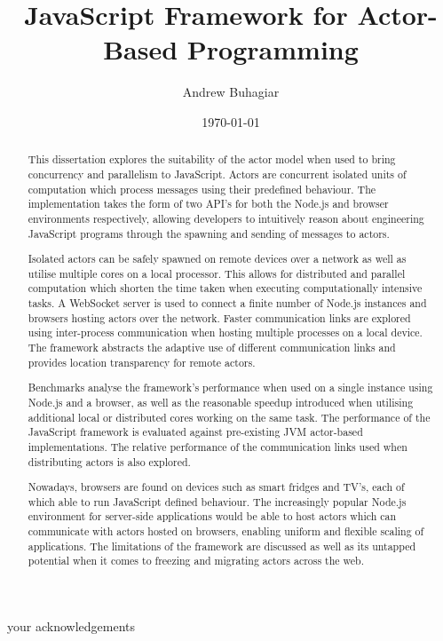 \documentclass[12pt, a4paper]{report}
\theoremstyle{definition}
\theoremstyle{definition}%
\theoremstyle{definition}%
\theoremstyle{definition}%
\theoremstyle{definition}%
\theoremstyle{definition}%
\begin{document}
\title{JavaScript Framework for Actor-Based Programming}
\author{Andrew Buhagiar}
\date{\today}

\frontmatter

\begin{acknowledgements}
your acknowledgements
\end{acknowledgements}
       
\begin{abstract}
This dissertation explores the suitability of the actor model when used to bring concurrency and parallelism to JavaScript. Actors are concurrent isolated units of computation which process messages using their predefined behaviour. The implementation takes the form of two API’s for both the Node.js and browser environments respectively, allowing developers to intuitively reason about engineering JavaScript programs through the spawning and sending of messages to actors.

Isolated actors can be safely spawned on remote devices over a network as well as utilise multiple cores on a local processor. This allows for distributed and parallel computation which shorten the time taken when executing computationally intensive tasks. A WebSocket server is used to connect a finite number of Node.js instances and browsers hosting actors over the network. Faster communication links are explored using inter-process communication when hosting multiple processes on a local device. The framework abstracts the adaptive use of different communication links and provides location transparency for remote actors.

Benchmarks analyse the framework’s performance when used on a single instance using Node.js and a browser, as well as the reasonable speedup introduced when utilising additional local or distributed cores working on the same task. The performance of the JavaScript framework is evaluated against pre-existing JVM actor-based implementations. The relative performance of the communication links used when distributing actors is also explored.

Nowadays, browsers are found on devices such as smart fridges and TV’s, each of which able to run JavaScript defined behaviour. The increasingly popular Node.js environment for server-side applications would be able to host actors which can communicate with actors hosted on browsers, enabling uniform and flexible scaling of applications. The limitations of the framework are discussed as well as its untapped potential when it comes to freezing and migrating actors across the web.
\end{abstract}
\end{document}
